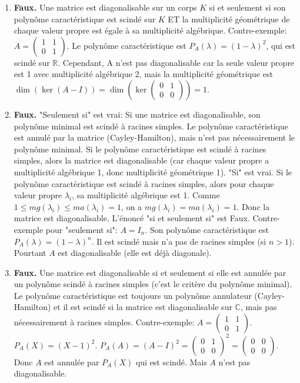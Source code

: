 \begin{solution}
\begin{enumerate}
    \item \textbf{Faux.} Une matrice est diagonalisable sur un corps $K$ si et seulement si son polynôme caractéristique est scindé sur $K$ ET la multiplicité géométrique de chaque valeur propre est égale à sa multiplicité algébrique.
    Contre-exemple: $A = \begin{pmatrix} 1 & 1 \\ 0 & 1 \end{pmatrix}$. Le polynôme caractéristique est $P_A(\lambda) = (1-\lambda)^2$, qui est scindé sur $\mathbb{R}$. Cependant, A n'est pas diagonalisable car la seule valeur propre est 1 avec multiplicité algébrique 2, mais la multiplicité géométrique est $\dim(\ker(A-I)) = \dim(\ker \begin{pmatrix} 0 & 1 \\ 0 & 0 \end{pmatrix}) = 1$.

    \item \textbf{Faux.} "Seulement si" est vrai: Si une matrice est diagonalisable, son polynôme minimal est scindé à racines simples. Le polynôme caractéristique est annulé par la matrice (Cayley-Hamilton), mais n'est pas nécessairement le polynôme minimal. Si le polynôme caractéristique est scindé à racines simples, alors la matrice est diagonalisable (car chaque valeur propre a multiplicité algébrique 1, donc multiplicité géométrique 1).
    "Si" est vrai. Si le polynôme caractéristique est scindé à racines simples, alors pour chaque valeur propre $\lambda_i$, sa multiplicité algébrique est 1. Comme $1 \le mg(\lambda_i) \le ma(\lambda_i) = 1$, on a $mg(\lambda_i) = ma(\lambda_i) = 1$. Donc la matrice est diagonalisable.
    L'énoncé "si et seulement si" est Faux.
    Contre-exemple pour "seulement si": $A = I_n$. Son polynôme caractéristique est $P_A(\lambda) = (1-\lambda)^n$. Il est scindé mais n'a pas de racines simples (si $n>1$). Pourtant $A$ est diagonalisable (elle est déjà diagonale).

    \item \textbf{Faux.} Une matrice est diagonalisable si et seulement si elle est annulée par un polynôme scindé à racines simples (c'est le critère du polynôme minimal). Le polynôme caractéristique est toujours un polynôme annulateur (Cayley-Hamilton) et il est scindé si la matrice est diagonalisable sur $\mathbb{C}$, mais pas nécessairement à racines simples.
    Contre-exemple: $A = \begin{pmatrix} 1 & 1 \\ 0 & 1 \end{pmatrix}$. $P_A(X) = (X-1)^2$. $P_A(A) = (A-I)^2 = \begin{pmatrix} 0 & 1 \\ 0 & 0 \end{pmatrix}^2 = \begin{pmatrix} 0 & 0 \\ 0 & 0 \end{pmatrix}$. Donc $A$ est annulée par $P_A(X)$ qui est scindé. Mais $A$ n'est pas diagonalisable.


\end{enumerate}
\end{solution}
